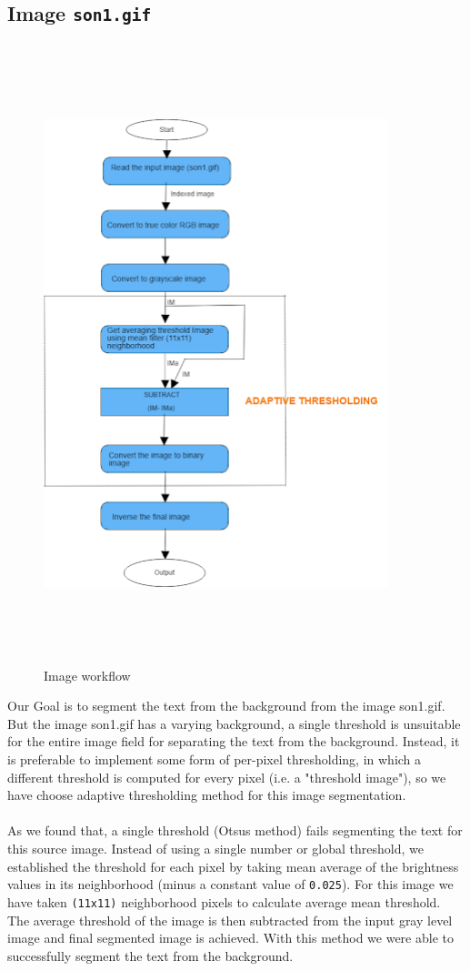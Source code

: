 \subsection{Image \texttt{son1.gif}}
\begin{figure}[h!]
  \centering
  \includegraphics[width=10cm,height=18cm,keepaspectratio]{img/son1_flow.png}
  \caption{Image  workflow}
\end{figure}

Our Goal is to segment the text from the background from the image son1.gif. But the image son1.gif has a varying background, a single threshold is unsuitable for the entire image field for separating the text from the background. Instead, it is preferable to implement some form of per-pixel thresholding, in which a different threshold is computed for every pixel (i.e. a "threshold image"), so we have choose adaptive thresholding method for this image segmentation.
\\
\\
As we found that, a single threshold (Otsus method) fails segmenting the text for this source image. Instead of using a single number or global threshold, we established the threshold for each pixel by taking mean average of the brightness values in its neighborhood (minus a constant value of \texttt{0.025}). For this image we have taken \texttt{(11x11)} neighborhood pixels to calculate average mean threshold. The average threshold of the image is then subtracted from the input gray level image and final segmented image is achieved. With this method we were able to successfully segment the text from the background.

